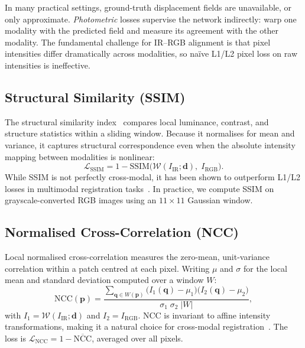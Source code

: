 In many practical settings, ground-truth displacement fields are unavailable,
or only approximate.  \emph{Photometric} losses supervise the network
indirectly: warp one modality with the predicted field and measure its
agreement with the other modality.  The fundamental challenge for IR--RGB
alignment is that pixel intensities differ dramatically across modalities, so
na\"ive L1/L2 pixel loss on raw intensities is ineffective.

\subsection{Structural Similarity (SSIM)}
\label{ssec:ssim}

The structural similarity index~\cite{wang2004ssim} compares local luminance,
contrast, and structure statistics within a sliding window.  Because it
normalises for mean and variance, it captures structural correspondence even
when the absolute intensity mapping between modalities is nonlinear:
%
\begin{equation}
  \mathcal{L}_{\text{SSIM}}
  = 1 - \text{SSIM}\!\bigl(\mathcal{W}(I_{\text{IR}};\mathbf{d}),\;
        I_{\text{RGB}}\bigr).
  \label{eq:ssim}
\end{equation}
%
While SSIM is not perfectly cross-modal, it has been shown to
outperform L1/L2 losses in multimodal registration
tasks~\cite{haskins2020deep}.  In practice, we compute SSIM on
grayscale-converted RGB images using an $11 \times 11$ Gaussian window.

\subsection{Normalised Cross-Correlation (NCC)}
\label{ssec:ncc}

Local normalised cross-correlation measures the zero-mean, unit-variance
correlation within a patch centred at each pixel.  Writing $\mu$ and $\sigma$
for the local mean and standard deviation computed over a window $W$:
%
\begin{equation}
  \text{NCC}(\mathbf{p})
  = \frac{\sum_{\mathbf{q}\in W(\mathbf{p})}
      \bigl(I_{1}(\mathbf{q})-\mu_{1}\bigr)
      \bigl(I_{2}(\mathbf{q})-\mu_{2}\bigr)}
    {\sigma_{1}\;\sigma_{2}\;|W|},
  \label{eq:ncc}
\end{equation}
%
with $I_{1} = \mathcal{W}(I_{\text{IR}};\mathbf{d})$ and $I_{2} =
I_{\text{RGB}}$.  NCC is invariant to affine intensity transformations, making
it a natural choice for cross-modal
registration~\cite{balakrishnan2019voxelmorph}.  The loss is $\mathcal{L}_{\text{NCC}} = 1 - \overline{\text{NCC}}$, averaged over all pixels.

